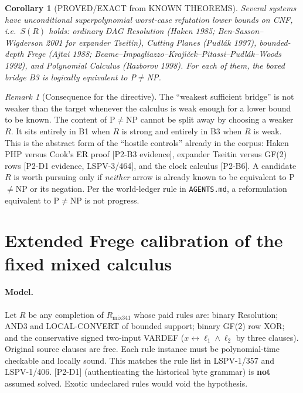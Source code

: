 \documentclass[11pt]{article}
\newtheorem{corollary}[theorem]{Corollary}
\theoremstyle{remark}
\newtheorem{remark}[theorem]{Remark}
\begin{document}
\begin{corollary}[PROVED/EXACT from KNOWN THEOREMS]\label{cor:known}
Several systems have unconditional superpolynomial worst-case refutation lower bounds on CNF, i.e.\ $S(R)$ holds:
ordinary DAG Resolution (Haken 1985; Ben-Sasson--Wigderson 2001 for expander Tseitin),
Cutting Planes (Pudl\'ak 1997),
bounded-depth Frege (Ajtai 1988; Beame--Impagliazzo--Kraj\'\i\v{c}ek--Pitassi--Pudl\'ak--Woods 1992),
and Polynomial Calculus (Razborov 1998).
For each of them, the boxed bridge B3 is \emph{logically equivalent to} P$\neq$NP.
\end{corollary}

\begin{remark}[Consequence for the directive]
The ``weakest sufficient bridge'' is not weaker than the target whenever the calculus is weak enough for a lower bound to be known. The content of P$\neq$NP cannot be split away by choosing a weaker $R$. It sits entirely in B1 when $R$ is strong and entirely in B3 when $R$ is weak. This is the abstract form of the ``hostile controls'' already in the corpus: Haken PHP versus Cook's ER proof [P2-B3 evidence], expander Tseitin versus GF(2) rows [P2-D1 evidence, LSPV-3/464], and the clock calculus [P2-B6]. A candidate $R$ is worth pursuing only if \emph{neither} arrow is already known to be equivalent to P$\neq$NP or its negation. Per the world-ledger rule in \texttt{AGENTS.md}, a reformulation equivalent to P$\neq$NP is not progress.
\end{remark}

\section{Extended Frege calibration of the fixed mixed calculus}
\paragraph{Model.} Let $R$ be any completion of $R_{\mathrm{mix341}}$ whose paid rules are: binary Resolution; AND3 and LOCAL-CONVERT of bounded support; binary GF(2) row XOR; and the conservative signed two-input VARDEF ($x\leftrightarrow \ell_1\wedge\ell_2$ by three clauses). Original source clauses are free. Each rule instance must be polynomial-time checkable and locally sound. This matches the rule list in LSPV-1/357 and LSPV-1/406. [P2-D1] (authenticating the historical byte grammar) is \textbf{not} assumed solved. Exotic undeclared rules would void the hypothesis.
\end{document}
